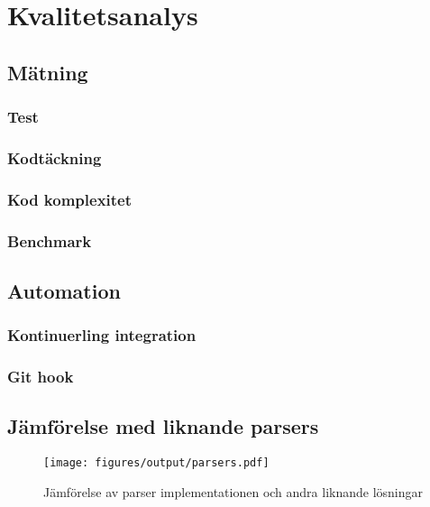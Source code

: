 \section{Kvalitetsanalys}

\subsection{Mätning}

\subsubsection{Test}

\subsubsection{Kodtäckning}

\subsubsection{Kod komplexitet}

\subsubsection{Benchmark}

\subsection{Automation}

\subsubsection{Kontinuerling integration}

\subsubsection{Git hook}

\subsection{Jämförelse med liknande parsers}

\begin{figure}[ht]
  \texttt{[image: figures/output/parsers.pdf]}
  \caption{Jämförelse av parser implementationen och andra liknande lösningar}
\end{figure}

